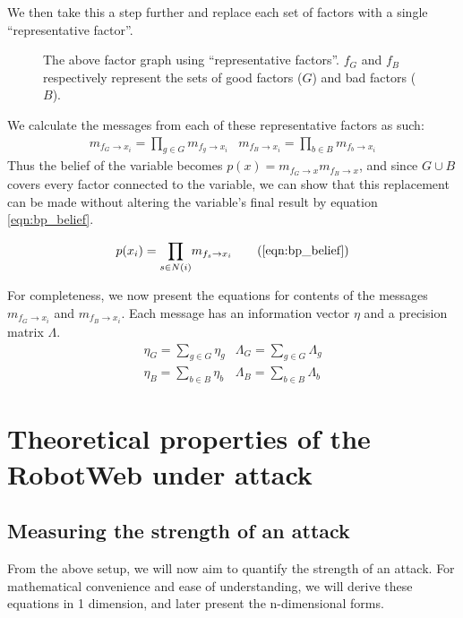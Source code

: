 We then take this a step further and replace each set of factors with a single ``representative factor''.
\begin{figure}[!ht]
	\centering
	

	\caption[Representative factor graph around a single variable]{The above factor graph using ``representative factors''. $f_G$ and $f_B$ respectively represent the sets of good factors ($G$) and bad factors ($B$).}
\end{figure}

We calculate the messages from each of these representative factors as such:
\begin{eqnarray}
	m_{f_G \rightarrow x_i} = \underset{g \in G}{\prod} m_{f_g \rightarrow x_i}&
	m_{f_B \rightarrow x_i} = \underset{b \in B}{\prod} m_{f_b \rightarrow x_i}
\end{eqnarray}
Thus the belief of the variable becomes $p(x) = m_{f_G \rightarrow x} m_{f_B \rightarrow x}$, and since $G \cup B$ covers every factor connected to the variable, we can show that this replacement can be made without altering the variable's final result by equation \ref{eqn:bp_belief}.

\begin{equation}
	p(x_i) = \underset{s \in N(i)}{\prod} m_{f_s \rightarrow x_i}
	\tag{\ref{eqn:bp_belief}}
\end{equation}

For completeness, we now present the equations for contents of the messages $m_{f_G \rightarrow x_i}$ and $m_{f_B \rightarrow x_i}$. 
Each message has an information vector $\eta$ and a precision matrix $\Lambda$.
\begin{eqnarray}
	\eta_G = \underset{g \in G}{\sum} \eta_g&
	\Lambda_G = \underset{g \in G}{\sum} \Lambda_g \label{eqn:good_pull}\\
	\eta_B = \underset{b \in B}{\sum} \eta_b&
	\Lambda_B = \underset{b \in B}{\sum} \Lambda_b \label{eqn:bad_pull}
\end{eqnarray}

\section{Theoretical properties of the RobotWeb under attack}
\subsection{Measuring the strength of an attack}
From the above setup, we will now aim to quantify the strength of an attack. For mathematical convenience and ease of understanding, we will derive these equations in 1 dimension, and later present the n-dimensional forms.

